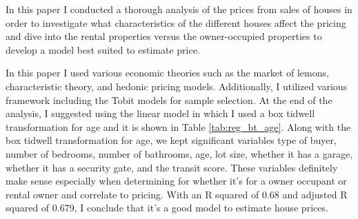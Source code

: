 
In this paper I conducted a thorough analysis of the prices from sales of houses in order to investigate what characteristics of the different houses affect the pricing and dive into the rental properties versus the owner-occupied properties to develop a model best suited to estimate price.

In this paper I used various economic theories such as the market of lemons, characteristic theory, and hedonic pricing models. 
Additionally, I utilized various framework including the Tobit models for sample selection. At the end of the analysis, I suggested using the linear model
in which I used a box tidwell transformation for age and it is shown in Table \ref{tab:reg_bt_age}.
Along with the box tidwell transformation for age, we kept significant variables type of buyer, number of bedrooms, number of bathrooms, age, lot size, whether it has a garage, whether it has a security gate, and the transit score. 
These variables definitely make sense especially when determining for whether it's for a owner occupant or rental owner and correlate to pricing. With an R squared of 0.68 and adjusted R squared of 0.679, I conclude that it's a good model to estimate house prices.





% 